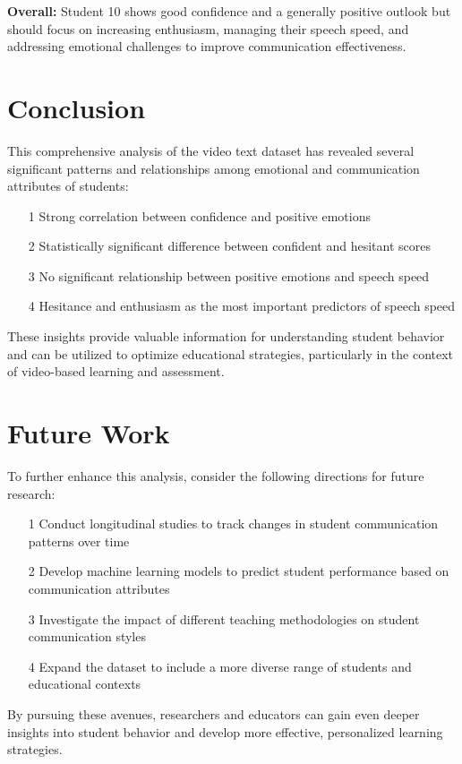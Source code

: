 \documentclass{article}
\begin{document}
\textbf{Overall:} Student 10 shows good confidence and a generally positive outlook but should focus on increasing enthusiasm, managing their speech speed, and addressing emotional challenges to improve communication effectiveness.



\vspace{0.3in}

\section{Conclusion}
This comprehensive analysis of the video text dataset has revealed several significant patterns and relationships among emotional and communication attributes of students:

\begin{enumerate}
    \item [\textcolor{accentColor1}{1}] Strong correlation between confidence and positive emotions
    \item [\textcolor{accentColor2}{2}] Statistically significant difference between confident and hesitant scores
    \item [\textcolor{accentColor3}{3}] No significant relationship between positive emotions and speech speed
    \item [\textcolor{primaryColor}{4}] Hesitance and enthusiasm as the most important predictors of speech speed
\end{enumerate}

These insights provide valuable information for understanding student behavior and can be utilized to optimize educational strategies, particularly in the context of video-based learning and assessment.

\section{Future Work}
To further enhance this analysis, consider the following directions for future research:

\begin{enumerate}
    \item [\textcolor{accentColor1}{1}] Conduct longitudinal studies to track changes in student communication patterns over time
    \item [\textcolor{accentColor2}{2}] Develop machine learning models to predict student performance based on communication attributes
    \item [\textcolor{accentColor3}{3}] Investigate the impact of different teaching methodologies on student communication styles
    \item [\textcolor{primaryColor}{4}] Expand the dataset to include a more diverse range of students and educational contexts
\end{enumerate}

By pursuing these avenues, researchers and educators can gain even deeper insights into student behavior and develop more effective, personalized learning strategies.
\end{document}
